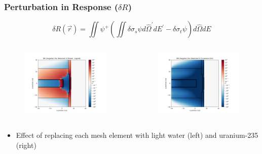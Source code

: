 \documentclass[t]{beamer}
\begin{document}
\begin{frame}
  \frametitle{Perturbation in Response ($\delta R$)}
  \vskip-0.25in
  \begin{equation*}
    \delta R\left(\vec{r}\right) = \iint\psi^+\left(\iint\delta\sigma_s\psi d\hat{\Omega}^\prime dE^\prime - \delta\sigma_t\psi\right)d\hat{\Omega}dE
  \end{equation*}
  \vskip-0.25in
  \begin{columns}
    \begin{figure}
      \includegraphics[trim={0.7in 0.15in 1.05in 0.4in},clip,scale=0.36]{images/dR_angular_08.png}
    \end{figure}
    \begin{figure}
      \includegraphics[trim={0.7in 0.15in 1.05in 0.4in},clip,scale=0.36]{images/dR_angular_09.png}
    \end{figure}
  \end{columns}
  \begin{itemize}
    \item Effect of replacing each mesh element with light water (left) and
          uranium-235 (right)
  \end{itemize}
\end{frame}
\end{document}
